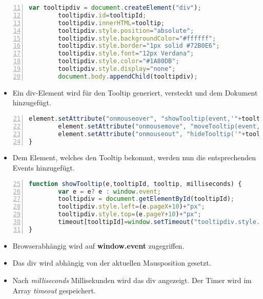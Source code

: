 \begin{frame}[<+->][fragile]
\tiny{\begin{lstlisting}[language=JavaScript, 
		   numbers=left,
		   numbersep=3pt,
		   breaklines=true,
		   firstnumber=11]
        var tooltipdiv = document.createElement("div");
        tooltipdiv.id=tooltipId;
        tooltipdiv.innerHTML=tooltip;
        tooltipdiv.style.position="absolute";
        tooltipdiv.style.backgroundColor="#ffffff";
        tooltipdiv.style.border="1px solid #72B0E6";
        tooltipdiv.style.font="12px Verdana";
        tooltipdiv.style.color="#1A80DB";
        tooltipdiv.style.display="none";
        document.body.appendChild(tooltipdiv);
\end{lstlisting}}
\normalsize
\pause
\begin{itemize}
\item Ein div-Element wird für den Tooltip generiert, versteckt und dem Dokument hinzugefügt.
\end{itemize}
\end{frame}
\begin{frame}[<+->][fragile]
\tiny{\begin{lstlisting}[language=JavaScript, 
		   numbers=left,
		   numbersep=3pt,
		   breaklines=true,
		   firstnumber=21]
        element.setAttribute("onmouseover", "showTooltip(event,'"+tooltipId+"', '"+tooltip+"',"+milliseconds+");");
        element.setAttribute("onmousemove", "moveTooltip(event,'"+tooltipId+"');");
        element.setAttribute("onmouseout", "hideTooltip('"+tooltipId+"');");
}
\end{lstlisting}}
\normalsize
\pause
\begin{itemize}
\item Dem Element, welches den Tooltip bekommt, werden nun die entsprechenden Events hinzugefügt.
\end{itemize}
\end{frame}
\begin{frame}[<+->][fragile]
\tiny{\begin{lstlisting}[language=JavaScript, 
		   numbers=left,
		   numbersep=3pt,
		   breaklines=true,
		   firstnumber=25]		 
function showTooltip(e,tooltipId, tooltip, milliseconds) {
        var e = e? e : window.event;
        tooltipdiv = document.getElementById(tooltipId);
        tooltipdiv.style.left=(e.pageX+10)+"px";
        tooltipdiv.style.top=(e.pageY+10)+"px";
        timeout[tooltipId]=window.setTimeout("tooltipdiv.style.display=\"block\"", milliseconds);
}		   
\end{lstlisting}}
\pause
\normalsize
\begin{itemize}
\item Browserabhängig wird auf \textbf{window.event} zugegriffen.
\item Das div wird abhängig von der aktuellen Mausposition gesetzt.
\item Nach \textit{milliseconds} Millisekunden wird das div angezeigt. Der Timer wird im Array \textit{timeout} gespeichert.
\end{itemize}

\end{frame}
